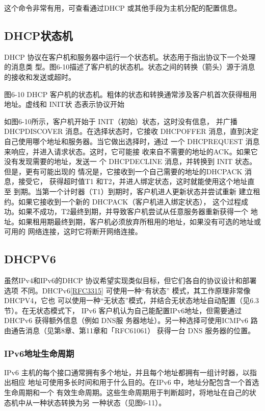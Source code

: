 这个命令非常有用，可查看通过DHCP 或其他手段为主机分配的配置信息。

\subsection{DHCP状态机}

DHCP 协议在客户机和服务器中运行一个状态机。状态用于指出协议下一个处理的消息类
型。图6-10描述了客户机的状态机。状态之间的转换（箭头）源于消息的接收和发送或超时。

图6-10 DHCP 客户机的状态机。粗体的状态和转换通常涉及客户机首次获得租用地址。虚线和 INIT状
态表示协议开始

如图6-10所示，客户机开始于 INIT（初始）状态，这时没有信息，
并广播 DHCPDISCOVER 消息。在选择状态时，它接收 DHCPOFFER
消息，直到决定自己使用哪个地址和服务器。当它做出选择时，通过
一个 DHCPREQUEST 消息来响应，并进入请求状态。这时，它可能接
收来自不需要的地址的ACK。如果它没有发现需要的地址，发送一
个 DHCPDECLINE 消息，并转换到 INIT 状态。但是，更有可能出现的
情况是，它接收到一个自己需要的地址的DHCPACK 消息，接受它，
获得超时值T1 和T2，并进人绑定状态，这时就能使用这个地址直至
到期。当第一个计时器（T1）到期时，客户机进人更新状态并尝试重新
建立租约。如果它接收到一个新的 DHCPACK（客户机进入绑定状态），
这个过程成功。如果不成功，T2最终到期，并导致客户机尝试从任意服务器重新获得一个
地址。如果租用期最终到期，客户机必须放弃所租用的地址，如果没有可选的地址或可用的
网络连接，这时它将断开网络连接。

\subsection{DHCPV6}
虽然IPv4和IPv6的DHCP 协议希望实现类似目标，但它们各自的协议设计和部署选项
不同。DHCPv6\href{https://www.rfc-editor.org/rfc/rfc3315}{\href{https://www.rfc-editor.org/rfc/rfc3315}{[RFC3315]}} 可使用一种“有状态” 模式，其工作原理非常像DHCPV4，它也
可以使用一种“无状态”模式，并结合无状态地址自动配置（见6.3节）。在无状态模式下，
IPv6 客户机认为自己能配置IPv6地址，但需要通过DHCPv6 获得额外信息（例如 DNS服
务器地址）。另一种选择可使用ICMPv6 路由通告消息（见第8章、第11章和「RFC61061）
获得一台 DNS 服务器的位置。

\subsubsection{IPv6地址生命周期}

IPv6 主机的每个接口通常拥有多个地址，并且每个地址都拥有一组计时器，以指出相应
地址可使用多长时间和用于什么目的。在IPv6 中，地址分配包含一个首选生命周期和一个
有效生命周期。这些生命周期用于判断超时，将地址在自己的状态机中从一种状态转换为另
一种状态（见图6-11）。


